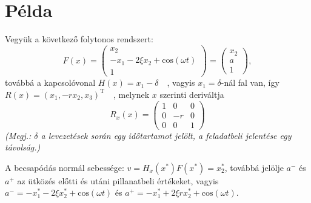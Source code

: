 \section{Példa}
Vegyük a következő folytonos rendszert:
\[F(x) = \left(
\begin{matrix}
x_2\\
-x_1 - 2 \xi x_2 + \mathrm{cos}(\omega t)\\
1
\end{matrix}
\right) = \left(
\begin{matrix}
x_2\\
a\\
1
\end{matrix}
\right),
\]
továbbá a kapcsolóvonal 
$ H(x) =  x_1 - \delta \quad$, vagyis $x_1 = \delta$-nál fal van, így
$ R(x) = \left(x_1,-rx_2,x_3\right)^\mathrm{T} \quad$, melynek $x$ szerinti deriváltja
\[R_x(x) = 
\left(
\begin{matrix}
1 & 0 & 0 \\
0 & -r & 0 \\
0 & 0 & 1
\end{matrix}
\right)\]
\textsl{(Megj.: $\delta$ a levezetések során egy időtartamot jelölt, a feladatbeli jelentése egy távolság.)}\par
A becsapódás normál sebessége: $v = H_x(x^*) F(x^*)=x_2^*$, továbbá jelölje $a^-$ és $a^+$ az ütközés előtti és utáni pillanatbeli értékeket, vagyis
$a^- = -x_{1}^* - 2 \xi x_{2}^* + \mathrm{cos}(\omega t)$ és
$a^+ = -x_{1}^* + 2 \xi r x_{2}^* + \mathrm{cos}(\omega t)$.

